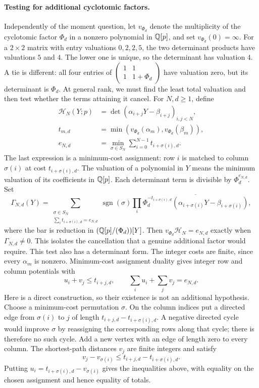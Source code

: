 \documentclass[11pt]{article}
\begin{document}
\paragraph{Testing for additional cyclotomic factors.}
Independently of the moment question, let $v_{\Phi_d}$ denote the
multiplicity of the cyclotomic factor $\Phi_d$ in a nonzero polynomial
in $\mathbb{Q}[p]$, and set $v_{\Phi_d}(0)=\infty$.
For a $2\times2$ matrix with entry valuations $0,2,2,5$, the two
determinant products have valuations $5$ and $4$. The lower one is
unique, so the determinant has valuation $4$. A tie is different:
all four entries of
$\left(\begin{smallmatrix}1&1\\1&1+\Phi_d\end{smallmatrix}\right)$
have valuation zero, but its determinant is $\Phi_d$.
At general rank, we must find the least total valuation and then test
whether the terms attaining it cancel. For $N,d\ge1$, define
\[
 \begin{aligned}
 \mathcal H_N(Y;p)&=\det(\alpha_{i+j}Y-\beta_{i+j})_{i,j<N},\\
 t_{m,d}&=\min(v_{\Phi_d}(\alpha_m),v_{\Phi_d}(\beta_m)),\\
 e_{N,d}&=\min_{\sigma\in S_N}\sum_{i=0}^{N-1}t_{i+\sigma(i),d}.
 \end{aligned}
\]
The last expression is a minimum-cost assignment: row $i$ is matched
to column $\sigma(i)$ at cost $t_{i+\sigma(i),d}$.
The valuation of a polynomial in $Y$ means the minimum valuation of
its coefficients in $\mathbb{Q}[p]$. Each determinant term is
divisible by $\Phi_d^{e_{N,d}}$. Set
\[
 \Gamma_{N,d}(Y)=
 \sum_{\substack{\sigma\in S_N\\\sum_i t_{i+\sigma(i),d}=e_{N,d}}}
 \operatorname{sgn}(\sigma)
 \prod_i\overline{\Phi_d^{-t_{i+\sigma(i),d}}
        (\alpha_{i+\sigma(i)}Y-\beta_{i+\sigma(i)})},
\]
where the bar is reduction in $(\mathbb{Q}[p]/(\Phi_d))[Y]$.
Then $v_{\Phi_d}\mathcal H_N=e_{N,d}$ exactly when
$\Gamma_{N,d}\ne0$. This isolates the cancellation that a genuine
additional factor would require.
This test also has a determinant form. The integer costs are finite,
since every $\alpha_m$ is nonzero. Minimum-cost assignment duality gives
integer row and column potentials with
\[
 u_i+v_j\le t_{i+j,d},\qquad
 \sum_i u_i+\sum_jv_j=e_{N,d}.
\]
Here is a direct construction, so their existence is not an additional
hypothesis. Choose a minimum-cost permutation $\sigma$. On the column
indices put a directed edge from $\sigma(i)$ to $j$ of length
$t_{i+j,d}-t_{i+\sigma(i),d}$. A negative directed cycle would improve
$\sigma$ by reassigning the corresponding rows along that cycle;
there is therefore no such cycle. Add a new vertex with an edge of
length zero to every column. The shortest-path distances $v_j$ are
finite integers and satisfy
\[
 v_j-v_{\sigma(i)}\le t_{i+j,d}-t_{i+\sigma(i),d}.
\]
Putting $u_i=t_{i+\sigma(i),d}-v_{\sigma(i)}$ gives the inequalities
above, with equality on the chosen assignment and hence equality of
totals.
\end{document}
